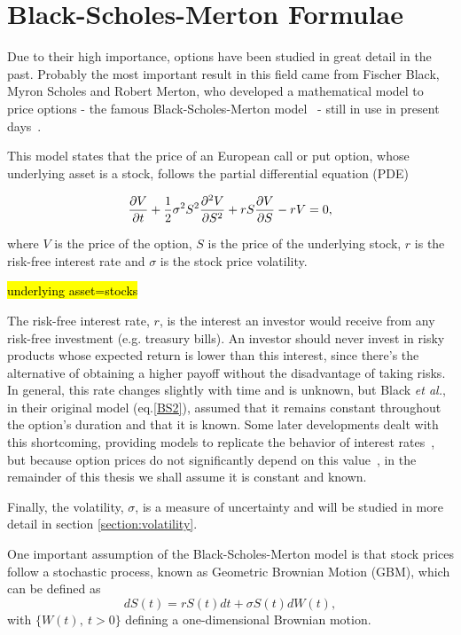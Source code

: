     
\section{Black-Scholes-Merton Formulae}
\label{section:Black-Scholes-Merton Formulae}
Due to their high importance, options have been studied in great detail in the past.
Probably the most important result in this field came from Fischer Black, Myron Scholes and Robert Merton, who developed a mathematical model to price options - the famous Black-Scholes-Merton model~\cite{Scholes} - still in use in present days~\cite{Wilmott3}.

This model states that the price of an European call or put option, whose underlying asset is a stock, follows the partial differential equation (PDE)

\begin{equation}\label{BS2}
\pdv{V}{t}+\frac{1}{2}\sigma^2S^2\pdv{^2V}{S^2}+rS\pdv{V}{S}-rV=0,
\end{equation}

\noindent where $V$ is the price of the option, $S$ is the price of the underlying stock, $r$ is the risk-free interest rate and $\sigma$ is the stock price volatility.

\hl{underlying asset=stocks}
 
The risk-free interest rate, $r$, is the interest an investor would receive from any risk-free investment (e.g. treasury bills). An investor should never invest in risky products whose expected return is lower than this interest, since there's the alternative of obtaining a higher payoff without the disadvantage of taking risks. In general, this rate changes slightly with time and is unknown, but Black \textit{et al.}, in their original model (eq.\eqref{BS2}), assumed that it remains constant throughout the option's duration and that it is known. Some later developments dealt with this shortcoming, providing models to replicate the behavior of interest rates~\cite{HJM}, but because option prices do not significantly depend on this value~\cite{Wilmott3}, in the remainder of this thesis we shall assume it is constant and known.

Finally, the volatility, $\sigma$, is a measure of uncertainty and will be studied in more detail in section \ref{section:volatility}.

One important assumption of the Black-Scholes-Merton model is that stock prices follow a stochastic process, known as Geometric Brownian Motion (GBM), which can be defined as
\begin{equation}\label{GBM}
dS(t)=rS(t)dt+\sigma S(t)dW(t),
\end{equation}
\noindent with $\{W(t),\ t>0\}$ defining a one-dimensional Brownian motion.



